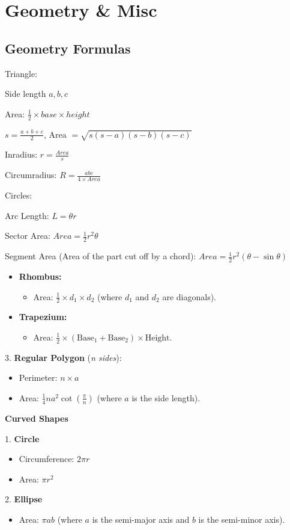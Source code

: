 \section{Geometry \texorpdfstring{\&}{&} Misc}
\subsection{Geometry Formulas}

Triangle:

Side length $a, b, c$

Area: $\frac{1}{2} \times base \times height$

$s = \frac{a+b+c}{2}$, Area $= \sqrt{s(s-a)(s-b)(s-c)}$

Inradius: $r = \frac{Area}{s}$

Circumradius: $R = \frac{abc}{4 \times Area}$

Circles:

Arc Length: $L = \theta r$

Sector Area: $Area = \frac{1}{2} r^2 \theta$

Segment Area (Area of the part cut off by a chord): $Area = \frac{1}{2} r^2 (\theta - \sin\theta)$

\begin{itemize}
  \item \textbf{Rhombus:}
  \begin{itemize}
    \item Area: $\frac{1}{2} \times d_1 \times d_2$ (where $d_1$ and $d_2$ are diagonals).
  \end{itemize}
  \item \textbf{Trapezium:}
  \begin{itemize}
    \item Area: $\frac{1}{2} \times (\text{Base}_1 + \text{Base}_2) \times \text{Height}$.
  \end{itemize}
\end{itemize}
3. \textbf{Regular Polygon} (\textit{n sides}):
\begin{itemize}
  \item Perimeter: $n \times a$
  \item Area: $\frac{1}{4}na^2 \cot\!\left(\frac{\pi}{n}\right)$ (where $a$ is the side length).
\end{itemize}

\textbf{Curved Shapes}

1. \textbf{Circle}
\begin{itemize}
  \item Circumference: $2\pi r$
  \item Area: $\pi r^2$
\end{itemize}
2. \textbf{Ellipse}
\begin{itemize}
  \item Area: $\pi a b$ (where $a$ is the semi-major axis and $b$ is the semi-minor axis).
\end{itemize}

